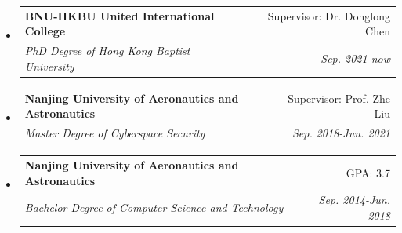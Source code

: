 \documentclass[letterpaper,11pt]{article}
\makeatletter
\newcommand{\resitem}[1]{\item #1 \vspace{-2pt}}
\newcommand{\ressubheading}[4]{
\begin{tabular*}{6.5in}{l@{\cftdotfill{\cftsecdotsep}\extracolsep{\fill}}r}
		\textbf{#1} & #2 \\
		\textit{#3} & \textit{#4} \\
\end{tabular*}\vspace{-6pt}}
\makeatother
\begin{document}
\begin{itemize}
\item
	\ressubheading{BNU-HKBU United International College}{Supervisor: Dr. Donglong Chen}{PhD Degree of Hong Kong Baptist University}{Sep. 2021-now}
%
\item
	\ressubheading{Nanjing University of Aeronautics and Astronautics}{Supervisor: Prof. Zhe Liu}{Master Degree of Cyberspace Security}{Sep. 2018-Jun. 2021}
%

\item
	\ressubheading{Nanjing University of Aeronautics and Astronautics}{GPA: 3.7}{Bachelor Degree of Computer Science and Technology}{Sep. 2014-Jun. 2018}
%

\end{itemize}
\end{document}
